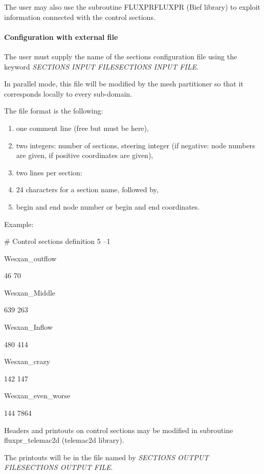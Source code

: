 \documentclass{article} %
\begin{document}
 The user may also use the subroutine FLUXPRFLUXPR (Bief library) to exploit information connected with the control sections.


\paragraph{ Configuration with external file}

 The user must supply the name of the sections configuration file using the keyword \textit{SECTIONS INPUT FILESECTIONS INPUT FILE}.

 In parallel mode, this file will be modified by the mesh partitioner so that it corresponds locally to every sub-domain.

 The file format is the following:

\begin{enumerate}
\item  one comment line (free but must be here),

\item  two integers: number of sections, steering integer (if negative: node numbers are given, if positive coordinates are given),

\item  two lines per section:

\item  24 characters for a section name, followed by,

\item  begin and end node number or begin and end coordinates.
\end{enumerate}

 Example:

 \# Control sections definition 5 --1

 Wesxan\_outflow

 46 70

 Wesxan\_Middle

 639 263

 Wesxan\_Inflow

 480 414

 Wesxan\_crazy

 142 147

 Wesxan\_even\_worse

 144 7864

 Headers and printouts on control sections may be modified in subroutine fluxpr\_telemac2d (telemac2d library).

 The printouts will be in the file named by \textit{SECTIONS OUTPUT FILESECTIONS OUTPUT FILE}.
\end{document}
